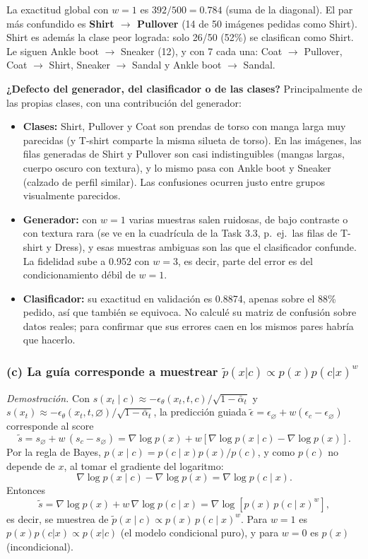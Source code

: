 \documentclass[11pt]{article}
\begin{document}
La exactitud global con $w=1$ es $392/500=0.784$ (suma de la diagonal). El par más confundido es \textbf{Shirt $\rightarrow$ Pullover} (14 de 50 imágenes pedidas como Shirt). Shirt es además la clase peor lograda: solo 26/50 (52\%) se clasifican como Shirt. Le siguen Ankle boot $\rightarrow$ Sneaker (12), y con 7 cada una: Coat $\rightarrow$ Pullover, Coat $\rightarrow$ Shirt, Sneaker $\rightarrow$ Sandal y Ankle boot $\rightarrow$ Sandal.

\textbf{¿Defecto del generador, del clasificador o de las clases?} Principalmente de las propias clases, con una contribución del generador:
\begin{itemize}
  \item \textbf{Clases:} Shirt, Pullover y Coat son prendas de torso con manga larga muy parecidas (y T-shirt comparte la misma silueta de torso). En las imágenes, las filas generadas de Shirt y Pullover son casi indistinguibles (mangas largas, cuerpo oscuro con textura), y lo mismo pasa con Ankle boot y Sneaker (calzado de perfil similar). Las confusiones ocurren justo entre grupos visualmente parecidos.
  \item \textbf{Generador:} con $w=1$ varias muestras salen ruidosas, de bajo contraste o con textura rara (se ve en la cuadrícula de la Task 3.3, p.\ ej.\ las filas de T-shirt y Dress), y esas muestras ambiguas son las que el clasificador confunde. La fidelidad sube a 0.952 con $w=3$, es decir, parte del error es del condicionamiento débil de $w=1$.
  \item \textbf{Clasificador:} su exactitud en validación es 0.8874, apenas sobre el 88\% pedido, así que también se equivoca. No calculé su matriz de confusión sobre datos reales; para confirmar que sus errores caen en los mismos pares habría que hacerlo.
\end{itemize}

\subsubsection*{(c) La guía corresponde a muestrear $\tilde p(x|c)\propto p(x)p(c|x)^w$}
\emph{Demostración.} Con $s(x_t\mid c)\approx-\epsilon_\theta(x_t,t,c)/\sqrt{1-\bar\alpha_t}$ y $s(x_t)\approx-\epsilon_\theta(x_t,t,\varnothing)/\sqrt{1-\bar\alpha_t}$, la predicción guiada $\tilde\epsilon=\epsilon_\varnothing+w(\epsilon_c-\epsilon_\varnothing)$ corresponde al score
\[\tilde s=s_\varnothing+w\,(s_c-s_\varnothing)=\nabla\log p(x)+w\left[\nabla\log p(x\mid c)-\nabla\log p(x)\right].\]
Por la regla de Bayes, $p(x\mid c)=p(c\mid x)p(x)/p(c)$, y como $p(c)$ no depende de $x$, al tomar el gradiente del logaritmo:
\[\nabla\log p(x\mid c)-\nabla\log p(x)=\nabla\log p(c\mid x).\]
Entonces
\[\tilde s=\nabla\log p(x)+w\,\nabla\log p(c\mid x)=\nabla\log\!\left[p(x)\,p(c\mid x)^w\right],\]
es decir, se muestrea de $\tilde p(x\mid c)\propto p(x)\,p(c\mid x)^w$. Para $w=1$ es $p(x)p(c|x)\propto p(x|c)$ (el modelo condicional puro), y para $w=0$ es $p(x)$ (incondicional).
\end{document}
